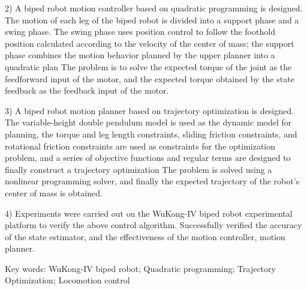 2) A biped robot motion controller based on quadratic programming is designed. The motion of each leg of the biped robot is divided into a support phase and a swing phase. 
The swing phase uses position control to follow the foothold position calculated according to the velocity of the center of mass; the support phase combines the motion behavior 
planned by the upper planner into a quadratic plan The problem is to solve the expected torque of the joint as the feedforward input of the motor, and the expected torque 
obtained by the state feedback as the feedback input of the motor.

3) A biped robot motion planner based on trajectory optimization is designed. The variable-height double pendulum model is used as the dynamic model for planning, 
the torque and leg length constraints, sliding friction constraints, and rotational friction constraints are used as constraints for the optimization problem, 
and a series of objective functions and regular terms are designed to finally construct a trajectory optimization The problem is solved using a nonlinear programming 
solver, and finally the expected trajectory of the robot's center of mass is obtained.

4) Experiments were carried out on the WuKong-IV biped robot experimental platform to verify the above control algorithm. 
Successfully verified the accuracy of the state estimator, and the effectiveness of the motion controller, motion planner.

Key words: WuKong-IV biped robot; Quadratic programming; Trajectory Optimization; Locomotion control